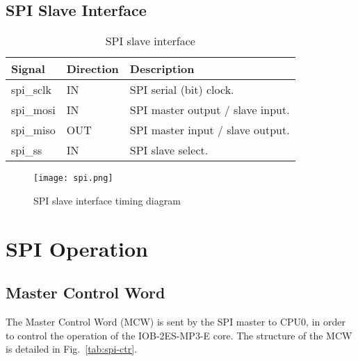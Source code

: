 \documentclass{ug}
\theoremstyle{plain}
\begin{document}
      
\subsection{SPI Slave Interface}

\begin{table}[H]
  \begin{center}
    \begin{tabular}{|l|l|l|}
      \hline

      \rowcolor{iob-green}
      \textbf{Signal} & \textbf{Direction} & \textbf{Description} \\
      \hline
      \hline

      spi\_sclk & IN & SPI serial (bit) clock.\\ \hline

      \rowcolor{iob-blue} spi\_mosi & IN & SPI master output / slave
      input.\\ \hline

      spi\_miso & OUT & SPI master input / slave output.\\ \hline

      \rowcolor{iob-blue} spi\_ss & IN & SPI slave select. \\ \hline

    \end{tabular}
    \caption{SPI slave interface}
    \label{tab:spi}
  \end{center}
\end{table}

\begin{figure}[H]
  \begin{center}
    \texttt{[image: spi.png]}
    \caption{SPI slave interface timing diagram}
    \label{fig:spi}
  \end{center}
\end{figure}


\section{SPI Operation}
\label{sec:spi}

\subsection{Master Control Word}

The Master Control Word (MCW) is sent by the SPI master to CPU0, in order to
control the operation of the IOB-2ES-MP3-E core. The structure of the MCW is
detailed in Fig.~\ref{tab:spi-ctr}.
\end{document}
